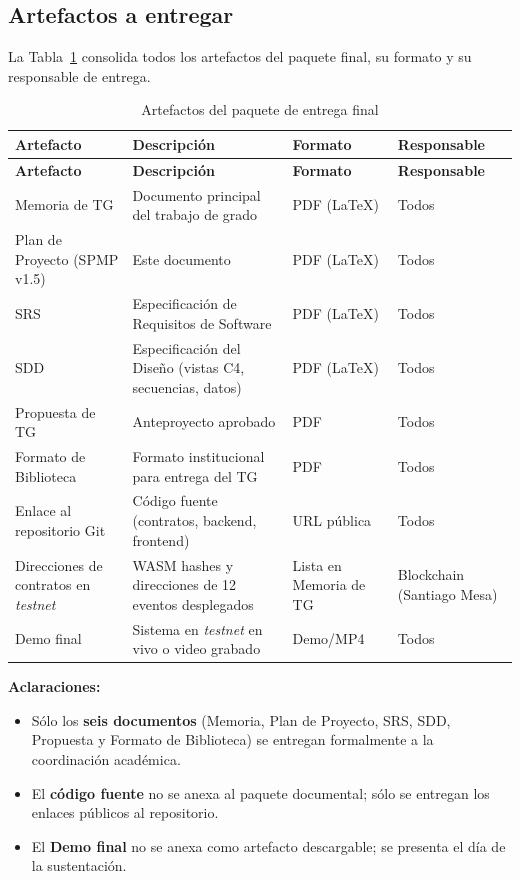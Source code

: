 \documentclass[12pt,oneside]{report}
\begin{document}
    \subsection{Artefactos a entregar}
    \label{subsec:artefactos-entrega}

      La Tabla~\ref{tab:artefactos-entrega} consolida todos los artefactos del paquete final, su formato y su responsable de entrega.

      \begin{longtable}{@{}p{4.5cm} p{4.0cm} p{3.0cm} p{3.0cm}@{}}
        \caption{Artefactos del paquete de entrega final}
        \label{tab:artefactos-entrega}\\
        \toprule
        \textbf{Artefacto} & \textbf{Descripción} & \textbf{Formato} & \textbf{Responsable}\\
        \midrule
        \endfirsthead
        \toprule
        \textbf{Artefacto} & \textbf{Descripción} & \textbf{Formato} & \textbf{Responsable}\\
        \midrule
        \endhead
        \bottomrule
        \endfoot
        Memoria de TG & Documento principal del trabajo de grado & PDF (\LaTeX) & Todos\\
        Plan de Proyecto (SPMP v1.5) & Este documento & PDF (\LaTeX) & Todos\\
        SRS & Especificación de Requisitos de Software & PDF (\LaTeX) & Todos\\
        SDD & Especificación del Diseño (vistas C4, secuencias, datos) & PDF (\LaTeX) & Todos\\
        Propuesta de TG & Anteproyecto aprobado & PDF & Todos\\
        Formato de Biblioteca & Formato institucional para entrega del TG & PDF & Todos\\
        Enlace al repositorio Git & Código fuente (contratos, backend, frontend) & URL pública & Todos\\
        Direcciones de contratos en \textit{testnet} & WASM hashes y direcciones de 12 eventos desplegados & Lista en Memoria de TG & Blockchain (Santiago Mesa)\\
        Demo final & Sistema en \textit{testnet} en vivo o video grabado & Demo/MP4 & Todos\\
      \end{longtable}

      \textbf{Aclaraciones:}
      \begin{itemize}
        \item Sólo los \textbf{seis documentos} (Memoria, Plan de Proyecto, SRS, SDD, Propuesta y Formato de Biblioteca) se entregan formalmente a la coordinación académica.
        \item El \textbf{código fuente} no se anexa al paquete documental; sólo se entregan los enlaces públicos al repositorio.
        \item El \textbf{Demo final} no se anexa como artefacto descargable; se presenta el día de la sustentación.
      \end{itemize}
\end{document}
